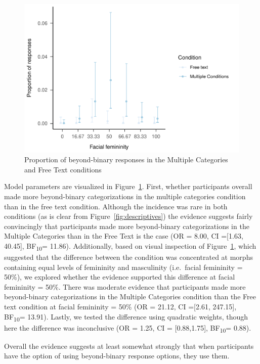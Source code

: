 \documentclass[
  man]{apa7}
\begin{document}
\begin{figure}
\centering
\includegraphics{resp_opts_manus23022_files/figure-latex/exp-one-inf-1.pdf}
\caption{\label{fig:exp-one-inf}Proportion of beyond-binary responses in the Multiple Categories and Free Text conditions}
\end{figure}

Model parameters are visualized in Figure~\ref{fig:exp-one-inf}. First, whether participants overall made more beyond-binary categorizations in the multiple categories condition than in the free text condition. Although the incidence was rare in both conditions (as is clear from Figure~\ref{fig:descriptives}) the evidence suggests fairly convincingly that participants made more beyond-binary categorizations in the Multiple Categories than in the Free Text is the case (OR = 8.00, CI ={[}1.63, 40.45{]}, BF\textsubscript{10}= 11.86). Additionally, based on visual inspection of Figure~\ref{fig:exp-one-inf}, which suggested that the difference between the condition was concentrated at morphs containing equal levels of femininity and masculinity (i.e.~facial femininity = 50\%), we explored whether the evidence supported this difference at facial femininity = 50\%. There was moderate evidence that participants made more beyond-binary categorizations in the Multiple Categories condition than the Free text condition at facial femininity = 50\% (OR = 21.12, CI ={[}2.61, 247.15{]}, BF\textsubscript{10}= 13.91). Lastly, we tested the difference using quadratic weights, though here the difference was inconclusive (OR = 1.25, CI = {[}0.88,1.75{]}, BF\textsubscript{10}= 0.88).

Overall the evidence suggests at least somewhat strongly that when participants have the option of using beyond-binary response options, they use them.
\end{document}
